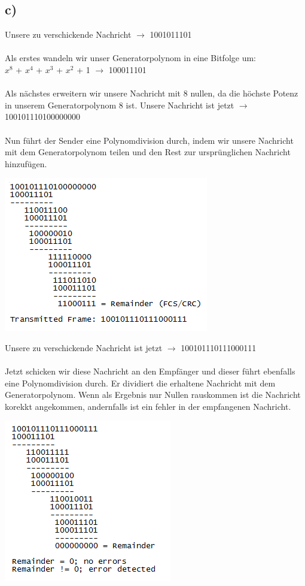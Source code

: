 \documentclass[a4paper,12pt]{scrartcl}
\begin{document}
\subsection{c)}
Unsere zu verschickende Nachricht $\rightarrow$ 1001011101\\\\
Als erstes wandeln wir unser Generatorpolynom in eine Bitfolge um:\\
$x^8$ + $x^4$ + $x^3$ + $x^2$ + 1 $\rightarrow$ 100011101\\\\
Als nächstes erweitern wir unsere Nachricht mit 8 nullen, da die höchste Potenz in unserem Generatorpolynom 8 ist. Unsere Nachricht ist jetzt $\rightarrow$ 100101110100000000\\\\
Nun führt der Sender eine Polynomdivision durch, indem wir unsere Nachricht mit dem Generatorpolynom teilen und den Rest zur ursprünglichen Nachricht hinzufügen.\\
\begin{center}
\includegraphics{./images/Aufgabe8c-sender}\\
\end{center}
Unsere zu verschickende Nachricht ist jetzt $\rightarrow$ 100101110111000111\\\\
Jetzt schicken wir diese Nachricht an den Empfänger und dieser führt ebenfalls eine Polynomdivision durch. Er dividiert die erhaltene Nachricht mit dem Generatorpolynom. Wenn als Ergebnis nur Nullen rauskommen ist die Nachricht korekkt angekommen, andernfalls ist ein fehler in der empfangenen Nachricht.\\
\begin{center}
\includegraphics{./images/Aufgabe8c-empfaenger}\\
\end{center}
\end{document}

